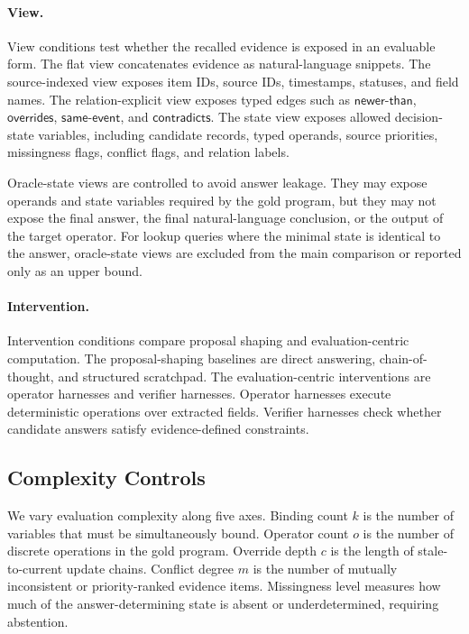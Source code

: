 \paragraph{View.}
View conditions test whether the recalled evidence is exposed in an evaluable form.
The flat view concatenates evidence as natural-language snippets.
The source-indexed view exposes item IDs, source IDs, timestamps, statuses, and field names.
The relation-explicit view exposes typed edges such as $\mathsf{newer\text{-}than}$, $\mathsf{overrides}$, $\mathsf{same\text{-}event}$, and $\mathsf{contradicts}$.
The state view exposes allowed decision-state variables, including candidate records, typed operands, source priorities, missingness flags, conflict flags, and relation labels.

Oracle-state views are controlled to avoid answer leakage.
They may expose operands and state variables required by the gold program, but they may not expose the final answer, the final natural-language conclusion, or the output of the target operator.
For lookup queries where the minimal state is identical to the answer, oracle-state views are excluded from the main comparison or reported only as an upper bound.

\paragraph{Intervention.}
Intervention conditions compare proposal shaping and evaluation-centric computation.
The proposal-shaping baselines are direct answering, chain-of-thought, and structured scratchpad.
The evaluation-centric interventions are operator harnesses and verifier harnesses.
Operator harnesses execute deterministic operations over extracted fields.
Verifier harnesses check whether candidate answers satisfy evidence-defined constraints.

\subsection{Complexity Controls}
\label{subsec:complexity-controls}

We vary evaluation complexity along five axes.
Binding count $k$ is the number of variables that must be simultaneously bound.
Operator count $o$ is the number of discrete operations in the gold program.
Override depth $c$ is the length of stale-to-current update chains.
Conflict degree $m$ is the number of mutually inconsistent or priority-ranked evidence items.
Missingness level measures how much of the answer-determining state is absent or underdetermined, requiring abstention.

